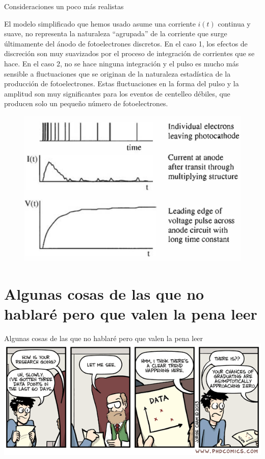 \documentclass[a4paper,10pt]{beamer}
\begin{document}
\begin{frame}{Consideraciones un poco más realistas}

\begin{justify}
\small
El modelo simplificado que hemos usado asume una corriente $i(t)$ continua y suave, 
no representa la naturaleza ``agrupada'' de la corriente que surge últimamente 
del ánodo de fotoelectrones discretos. En el caso 1, los efectos de discreción 
son muy suavizados por el proceso de integración de corrientes que se hace. En el 
caso 2, no se hace ninguna integración y el pulso es mucho más sensible a fluctuaciones 
que se originan de la naturaleza estadística de la producción de fotoelectrones. Estas 
fluctuaciones en la forma del pulso y la amplitud son muy significantes para los eventos 
de centelleo débiles, que producen solo un pequeño número de fotoelectrones.
\end{justify}

\begin{figure}
 \center
 \includegraphics[scale=0.38]{fig47}
\end{figure}
\end{frame}

\section{Algunas cosas de las que no hablaré pero que valen la pena leer}

\begin{frame}
\begin{center}
 {\Huge{\color{blue}Algunas cosas de las que no hablaré pero que valen la pena leer}} \\
 \vspace{0.5cm}
 \includegraphics[scale=0.5]{fig43}
\end{center}
\end{frame}
\end{document}

